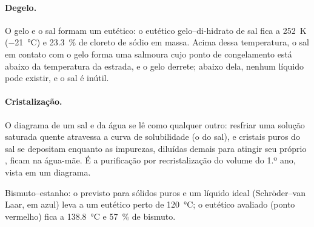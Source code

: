 \paragraph{Degelo.} O gelo e o sal formam um eutético: o eutético
gelo--di-hidrato de sal fica a \qty{252}{K} (\qty{-21}{\degreeCelsius}) e
23.3~\% de cloreto de sódio em massa. Acima dessa temperatura, o sal em
contato com o gelo forma uma salmoura cujo ponto de congelamento está abaixo
da temperatura da estrada, e o gelo derrete; abaixo dela, nenhum líquido pode
existir, e o sal é inútil.

\paragraph{Cristalização.} O diagrama de um sal e da água se lê como
qualquer outro: resfriar uma solução saturada quente atravessa a curva de
solubilidade (o  do sal), e cristais puros do sal se depositam
enquanto as impurezas, diluídas demais para atingir seu próprio ,
ficam na água-mãe. É a purificação por recristalização do volume do 1.º
ano, vista em um diagrama.

\begin{omfigure}

{\small Bismuto--estanho: o  previsto para sólidos puros e um líquido
ideal (Schröder--van Laar, em azul) leva a um eutético perto de
\qty{120}{\degreeCelsius}; o eutético avaliado (ponto vermelho) fica a
\qty{138.8}{\degreeCelsius} e 57~\% de bismuto.}
\end{omfigure}

